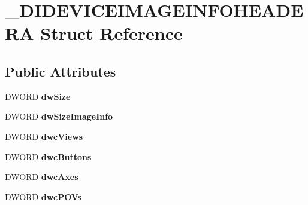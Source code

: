 \hypertarget{struct___d_i_d_e_v_i_c_e_i_m_a_g_e_i_n_f_o_h_e_a_d_e_r_a}{\section{\-\_\-\-D\-I\-D\-E\-V\-I\-C\-E\-I\-M\-A\-G\-E\-I\-N\-F\-O\-H\-E\-A\-D\-E\-R\-A Struct Reference}
\label{struct___d_i_d_e_v_i_c_e_i_m_a_g_e_i_n_f_o_h_e_a_d_e_r_a}
}
\subsection*{Public Attributes}
\begin{DoxyCompactItemize}
\item 
\hypertarget{struct___d_i_d_e_v_i_c_e_i_m_a_g_e_i_n_f_o_h_e_a_d_e_r_a_a82de0622a3d340ef22e4503eabc869c2}{D\-W\-O\-R\-D {\bfseries dw\-Size}}\label{struct___d_i_d_e_v_i_c_e_i_m_a_g_e_i_n_f_o_h_e_a_d_e_r_a_a82de0622a3d340ef22e4503eabc869c2}

\item 
\hypertarget{struct___d_i_d_e_v_i_c_e_i_m_a_g_e_i_n_f_o_h_e_a_d_e_r_a_a0eb1705f79625c5fa63b8daa6001b51b}{D\-W\-O\-R\-D {\bfseries dw\-Size\-Image\-Info}}\label{struct___d_i_d_e_v_i_c_e_i_m_a_g_e_i_n_f_o_h_e_a_d_e_r_a_a0eb1705f79625c5fa63b8daa6001b51b}

\item 
\hypertarget{struct___d_i_d_e_v_i_c_e_i_m_a_g_e_i_n_f_o_h_e_a_d_e_r_a_ac5bae9ae744982a1f5c86191a6f8692e}{D\-W\-O\-R\-D {\bfseries dwc\-Views}}\label{struct___d_i_d_e_v_i_c_e_i_m_a_g_e_i_n_f_o_h_e_a_d_e_r_a_ac5bae9ae744982a1f5c86191a6f8692e}

\item 
\hypertarget{struct___d_i_d_e_v_i_c_e_i_m_a_g_e_i_n_f_o_h_e_a_d_e_r_a_a9dac81e5a6bb0af3b4a139183f0dc62c}{D\-W\-O\-R\-D {\bfseries dwc\-Buttons}}\label{struct___d_i_d_e_v_i_c_e_i_m_a_g_e_i_n_f_o_h_e_a_d_e_r_a_a9dac81e5a6bb0af3b4a139183f0dc62c}

\item 
\hypertarget{struct___d_i_d_e_v_i_c_e_i_m_a_g_e_i_n_f_o_h_e_a_d_e_r_a_a4a8407f84ad0d8eb1743f617bf7904f8}{D\-W\-O\-R\-D {\bfseries dwc\-Axes}}\label{struct___d_i_d_e_v_i_c_e_i_m_a_g_e_i_n_f_o_h_e_a_d_e_r_a_a4a8407f84ad0d8eb1743f617bf7904f8}

\item 
\hypertarget{struct___d_i_d_e_v_i_c_e_i_m_a_g_e_i_n_f_o_h_e_a_d_e_r_a_a0272ef28899acd29b304a9243ee02e12}{D\-W\-O\-R\-D {\bfseries dwc\-P\-O\-Vs}}\label{struct___d_i_d_e_v_i_c_e_i_m_a_g_e_i_n_f_o_h_e_a_d_e_r_a_a0272ef28899acd29b304a9243ee02e12}


\end{DoxyCompactItemize}

